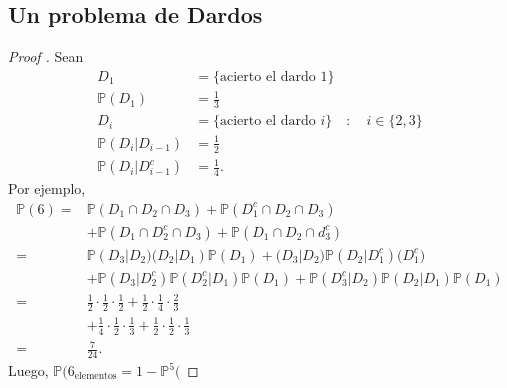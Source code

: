 \documentclass[a4paper]{report}
\begin{document}
\subsection{Un problema de Dardos}

\begin{proof}[Proof ]
	Sean
	\begin{align*}
		D_1 &= \{\text{acierto el dardo } 1\}   \\
		\mathbb{P}(D_1) & = \frac{1}{3} \\
		D_i &= \{\text{acierto el dardo } i\} \quad : \quad i \in \{2,3\}  \\
		\mathbb{P}(D_i|D_{i-1}) &= \frac{1}{2} \\
		\mathbb{P}(D_i|D_{i-1}^c) &= \frac{1}{4}
	.\end{align*}
	Por ejemplo,
	\begin{align*}
		\mathbb{P}(6) = & \mathbb{P}(D_1\cap D_2 \cap D_{3}) + \mathbb{P}(D_1^c \cap D_2 \cap D_3) \\
		& + \mathbb{P}(D_1\cap D_2^c \cap D_{3}) + \mathbb{P}(D_1\cap D_{2} \cap d_{3}^c) \\
		= & \mathbb{P}(D_{3}|D_{2})\mathbb(D_{2}|D_{1}) \mathbb{P}(D_{1}) + \mathbb(D_{3}|D_{2}) \mathbb{P}(D_{2}|D_{1}^c)\mathbb(D_{1}^c) \\
		& + \mathbb{P}(D_{3}|D_{2}^c)\mathbb{P}(D_{2}^c|D_{1}) \mathbb{P}(D_{1}) + \mathbb{P}(D_{3}^c|D_{2}) \mathbb{P}(D_{2}|D_{1}) \mathbb{P}(D_{1}) \\
		= & \frac{1}{2}\cdot\frac{1}{2}\cdot\frac{1}{2} + \frac{1}{2}\cdot\frac{1}{4}\cdot\frac{2}{3} \\
		& + \frac{1}{4}\cdot\frac{1}{2}\cdot\frac{1}{3}  + \frac{1}{2}\cdot\frac{1}{2}\cdot\frac{1}{3} \\
		= & \frac{7}{24}
	.\end{align*}
	Luego, $\mathbb{P}(6_{\text{elementos}} = 1 - \mathbb{P}^5($
\end{proof}





\end{document}
